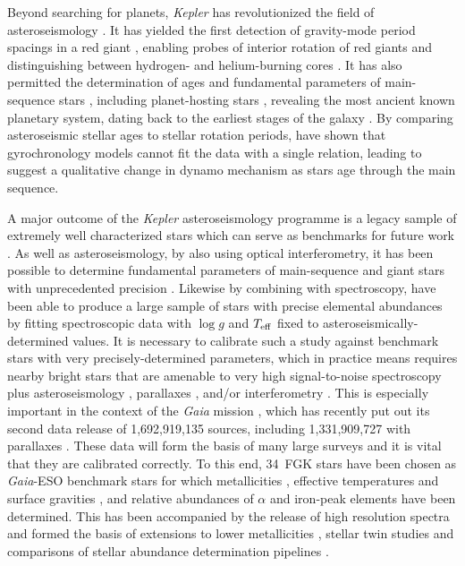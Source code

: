 \documentclass[a4paper,fleqn,usenatbib]{mnras}
\newcommand{\teff}{\mbox{$T_{\rm eff}$}\xspace}
\newcommand{\logg}{\mbox{$\log g$}\xspace}
\newcommand{\kepler}{\emph{Kepler}\xspace}
\newcommand{\gaia}{\emph{Gaia}\xspace}
\begin{document}
Beyond searching for planets, \kepler has revolutionized the field of asteroseismology \citep{2010PASP..122..131G}. It has yielded the first detection of gravity-mode period spacings in a red giant \citep{rggmodes}, enabling probes of interior rotation of red giants \citep{rggmoderotation} and distinguishing between hydrogen- and helium-burning cores \citep{rggmodehelium}. It has also permitted the determination of ages and fundamental parameters of main-sequence stars \citep{silvaages}, including planet-hosting stars \citep{huberplanetages,silvaplanetages,2018MNRAS.479.4786V}, revealing the most ancient known planetary system, dating back to the earliest stages of the galaxy \citep{ancientplanets}. By comparing asteroseismic stellar ages to stellar rotation periods, \citet{angusgyro} have shown that gyrochronology models cannot fit the data with a single relation, leading \citet{vansadersgyro} to suggest a qualitative change in dynamo mechanism as stars age through the main sequence. 

A major outcome of the \kepler asteroseismology programme is a legacy sample of extremely well characterized stars which can serve as benchmarks for future work \citep{keplerlegacy1,keplerlegacy2}. As well as asteroseismology, by also using optical interferometry, it has been possible to determine fundamental parameters of main-sequence and giant stars with unprecedented precision \citep{huber12,thetacygwhite,white15}. Likewise by combining with spectroscopy, \citet{hawkinsapogee} have been able to produce a large sample of stars with precise elemental abundances by fitting spectroscopic data with \logg and \teff fixed to asteroseismically-determined values. It is necessary to calibrate such a study against benchmark stars with very precisely-determined parameters, which in practice means requires nearby bright stars that are amenable to very high signal-to-noise spectroscopy plus asteroseismology \citep{creeveybenchmark},  parallaxes \citep{hawkinsbenchmarks}, and/or interferometry \citep{casagrandebenchmark,creeveybenchmark2}. This is especially important in the context of the \gaia mission \citep{gaia}, which has recently put out its second data release of 1,692,919,135 sources, including 1,331,909,727 with parallaxes \citep{gaiadr2}. These data will form the basis of many large surveys and it is vital that they are calibrated correctly. To this end, 34~FGK stars have been chosen as \gaia-ESO benchmark stars for which metallicities \citep{gaiabenchmark1}, effective temperatures and surface gravities \citep{gaiabenchmark3}, and relative abundances of $\alpha$ and iron-peak elements \citep{gaiabenchmark4} have been determined. This has been accompanied by the release of high resolution spectra \citep{gaiabenchmark2} and formed the basis of extensions to lower metallicities \citep{gaiabenchmark5}, stellar twin studies \citep{gaiabenchmarktwins} and comparisons of stellar abundance determination pipelines \citep{gaiabenchmarkabundances}. 
\end{document}
